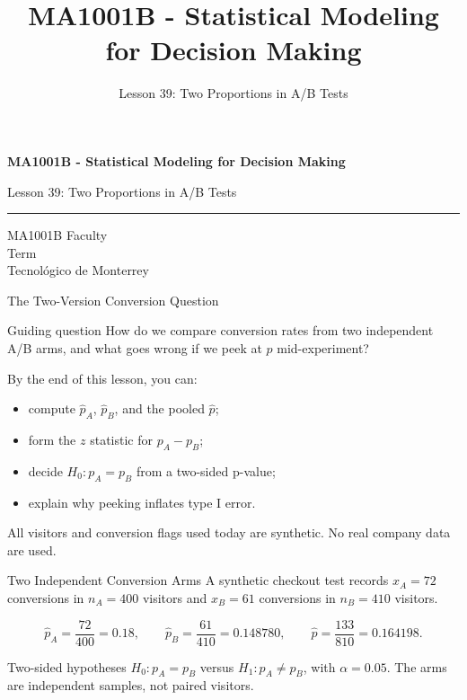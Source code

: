 \documentclass[aspectratio=169,10pt,english]{beamer}
\title{MA1001B - Statistical Modeling for Decision Making}
\subtitle{Lesson 39: Two Proportions in A/B Tests}
\author{}
\institute{Tecnol\'ogico de Monterrey}
\date{}
\begin{document}
\begin{frame}[plain]
  \vspace{1.2cm}
  {\Large\bfseries MA1001B - Statistical Modeling for Decision Making\par}
  \vspace{0.7cm}
  {\large Lesson 39: Two Proportions in A/B Tests\par}
  \vspace{0.7cm}
  {\color{TecRojo}\rule{\textwidth}{1.2pt}}
  \vspace{0.8cm}

  MA1001B Faculty\\[0.3cm]
  Term\\[0.3cm]
  Tecnol\'ogico de Monterrey
\end{frame}

\begin{frame}{The Two-Version Conversion Question}
  \begin{alertblock}{Guiding question}
    How do we compare conversion rates from two independent A/B arms, and
    what goes wrong if we peek at $p$ mid-experiment?
  \end{alertblock}

  \vspace{0.6em}
  By the end of this lesson, you can:
  \begin{itemize}
    \item compute $\hat{p}_A$, $\hat{p}_B$, and the pooled $\hat{p}$;
    \item form the $z$ statistic for $p_A-p_B$;
    \item decide $H_0:p_A=p_B$ from a two-sided p-value;
    \item explain why peeking inflates type I error.
  \end{itemize}

  \vfill
  \scriptsize All visitors and conversion flags used today are synthetic. No real company data are used.
\end{frame}

\begin{frame}{Two Independent Conversion Arms}
  \small
  A synthetic checkout test records $x_A=72$ conversions in $n_A=400$
  visitors and $x_B=61$ conversions in $n_B=410$ visitors.

  \[
    \hat{p}_A=\frac{72}{400}=0.18,\qquad
    \hat{p}_B=\frac{61}{410}=0.148780,\qquad
    \hat{p}=\frac{133}{810}=0.164198.
  \]

  \begin{exampleblock}{Two-sided hypotheses}
    $H_0:p_A=p_B$ versus $H_1:p_A\neq p_B$, with $\alpha=0.05$. The arms are
    independent samples, not paired visitors.
  \end{exampleblock}
\end{frame}
\end{document}
